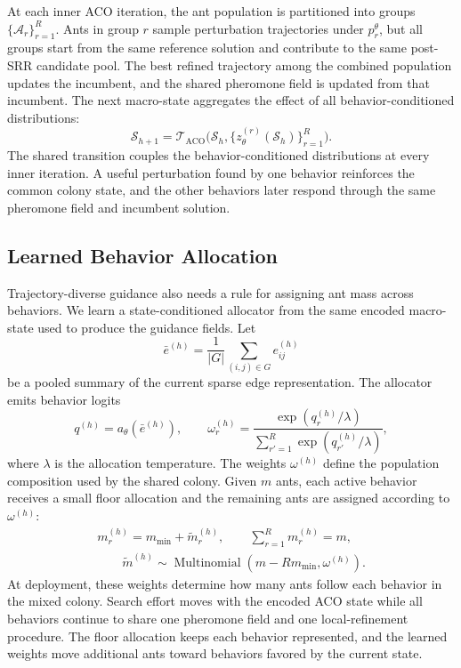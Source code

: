 At each inner ACO iteration, the ant population is partitioned into groups $\{\mathcal{A}_r\}_{r=1}^R$. Ants in group $r$ sample perturbation trajectories under $p_r^\theta$, but all groups start from the same reference solution and contribute to the same post-SRR candidate pool. The best refined trajectory among the combined population updates the incumbent, and the shared pheromone field is updated from that incumbent. The next macro-state aggregates the effect of all behavior-conditioned distributions:
\begin{equation}
\mathcal{S}_{h+1}
=
\mathcal{T}_{\mathrm{ACO}}
\bigl(\mathcal{S}_h,\{z_\theta^{(r)}(\mathcal{S}_h)\}_{r=1}^{R}\bigr).
\end{equation}
The shared transition couples the behavior-conditioned distributions at every inner iteration. A useful perturbation found by one behavior reinforces the common colony state, and the other behaviors later respond through the same pheromone field and incumbent solution.

\subsection{Learned Behavior Allocation}
\label{sec:tdg-allocation}

Trajectory-diverse guidance also needs a rule for assigning ant mass across behaviors. We learn a state-conditioned allocator from the same encoded macro-state used to produce the guidance fields. Let
\begin{equation}
\bar e^{(h)}
=
\frac{1}{|G|}
\sum_{(i,j)\in G} e_{ij}^{(h)}
\end{equation}
be a pooled summary of the current sparse edge representation. The allocator emits behavior logits
\begin{equation}
q^{(h)} = a_{\theta}(\bar e^{(h)}),
\qquad
\omega_r^{(h)}
=
\frac{\exp(q_r^{(h)}/\lambda)}
{\sum_{r'=1}^{R}\exp(q_{r'}^{(h)}/\lambda)},
\label{eq:learned-allocation}
\end{equation}
where $\lambda$ is the allocation temperature. The weights $\omega^{(h)}$ define the population composition used by the shared colony. Given $m$ ants, each active behavior receives a small floor allocation and the remaining ants are assigned according to $\omega^{(h)}$:
\begin{multline}
m_r^{(h)}
= m_{\min}+\tilde m_r^{(h)},
\qquad
\sum_{r=1}^{R}m_r^{(h)}=m, \\
\qquad
\tilde m^{(h)} \sim
\operatorname{Multinomial}\!\left(m-Rm_{\min},\omega^{(h)}\right).
\label{eq:learned-ant-counts}
\end{multline}
At deployment, these weights determine how many ants follow each behavior in the mixed colony. Search effort moves with the encoded ACO state while all behaviors continue to share one pheromone field and one local-refinement procedure. The floor allocation keeps each behavior represented, and the learned weights move additional ants toward behaviors favored by the current state.

